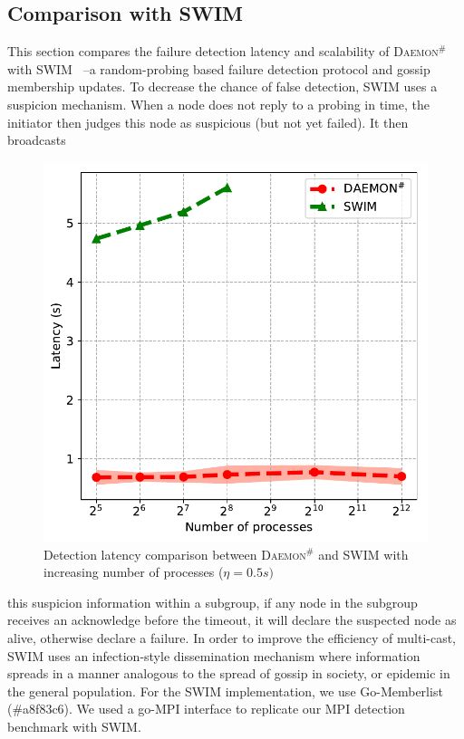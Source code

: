 \documentclass[sigconf]{acmart}
\newcommand{\mpi}[0]{\textsc{MPI}\xspace}
\newcommand{\ourwork}[0]{\textsc{Daemon}\ensuremath{^\#}\xspace}
\begin{document}
\subsection{Comparison with SWIM}
This section compares the failure detection latency and scalability of \ourwork with SWIM~\cite{Abhinandan02} --a random-probing based failure detection protocol and gossip membership updates. To decrease 
the chance of false detection, SWIM uses a suspicion mechanism. When a node does not reply to a probing in time, the initiator then judges this node as suspicious (but not yet failed). It then broadcasts
\begin{figure}[h]
  \centering
  \includegraphics[width=\linewidth]{Scale_prrte_swim.pdf}
  \caption{Detection latency comparison between \ourwork and SWIM with increasing number of processes ($\eta=0.5s)$}
  \label{fig:scale_swim}
\end{figure}
this suspicion information within a subgroup, if any node in the subgroup receives an acknowledge before the timeout, it will declare the suspected node as alive, otherwise declare a failure. In order to improve the efficiency of multi-cast, SWIM uses an infection-style dissemination mechanism where information spreads in a manner analogous to the spread of gossip in society, or epidemic in the general population.
For the SWIM implementation, we use Go-Memberlist (\#a8f83c6). We used a go-\mpi interface 
to replicate our \mpi detection benchmark with SWIM.
\end{document}
